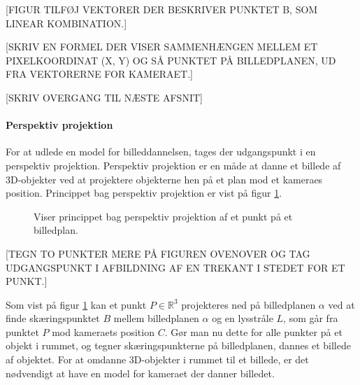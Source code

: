 [FIGUR TILFØJ VEKTORER DER BESKRIVER PUNKTET B, SOM LINEAR KOMBINATION.]

[SKRIV EN FORMEL DER VISER SAMMENHÆNGEN MELLEM ET PIXELKOORDINAT (X, Y) OG SÅ PUNKTET PÅ BILLEDPLANEN, UD FRA VEKTORERNE FOR KAMERAET.]

[SKRIV OVERGANG TIL NÆSTE AFSNIT]

\paragraph{Perspektiv projektion}
\label{sec:perspektiv_projektion}
For at udlede en model for billeddannelsen, tages der udgangspunkt i en perspektiv projektion. Perspektiv projektion er en måde at danne et billede af 3D-objekter ved at projektere objekterne hen på et plan mod et kameraes position\cite{fig:perspective_projection}. Princippet bag perspektiv projektion er vist på figur \ref{fig:perspektiv_projektion}.

\begin{figure}[H]
  \label{fig:perspektiv_projektion}
  \centering
  \caption{Viser princippet bag perspektiv projektion af et punkt på et billedplan.}
\end{figure}

[TEGN TO PUNKTER MERE PÅ FIGUREN OVENOVER OG TAG UDGANGSPUNKT I AFBILDNING AF EN TREKANT I STEDET FOR ET PUNKT.]

Som vist på figur \ref{fig:perspektiv_projektion} kan et punkt $P\in \mathbb{R}^3$ projekteres ned på billedplanen $\alpha$ ved at finde skæringspunktet $B$ mellem billedplanen $\alpha$ og en lysstråle $L$, som går fra punktet $P$ mod kameraets position $C$. Gør man nu dette for alle punkter på et objekt i rummet, og tegner skæringspunkterne på billedplanen, dannes et billede af objektet. For at omdanne 3D-objekter i rummet til et billede, er det nødvendigt at have en model for kameraet der danner billedet. 

